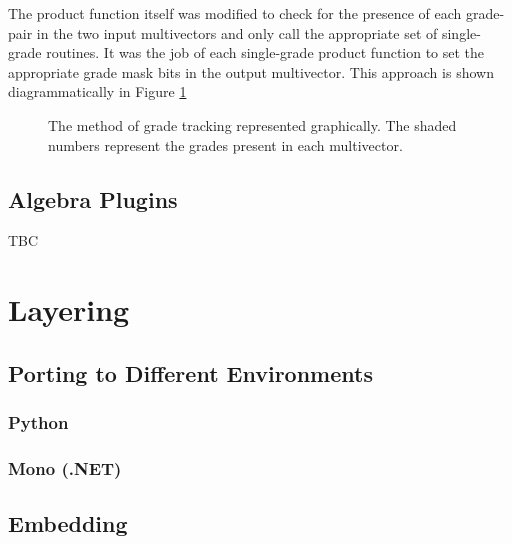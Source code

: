 The product function itself was modified to check for the presence of each 
grade-pair in the two input multivectors and only call the appropriate 
set of single-grade routines. It was the job of each single-grade
product function to set the appropriate grade mask bits in the output multivector.
This approach is shown diagrammatically in Figure \ref{fig:parallel}

\begin{figure}
\centering
{}
\caption{The method of grade tracking represented graphically. The shaded
numbers represent the grades present in each multivector.\label{fig:parallel}}
\end{figure}


\subsection{Algebra Plugins}

TBC

\section{Layering}

\subsection{Porting to Different Environments}

\subsubsection{Python}
\subsubsection{Mono (.NET)}

\subsection{Embedding}

